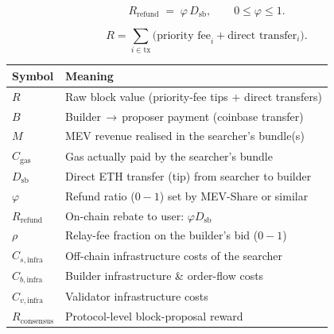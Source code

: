 \documentclass[a4paper,11pt]{article}
\begin{document}
\[
   R_{\text{refund}}
      \;=\; \varphi\,D_{\text{sb}},\qquad
   0\le \varphi \le 1.
\]

\[
  R = \sum_{i\in\text{tx}}
        \bigl(
          \text{priority fee}_i
          + \text{direct transfer}_i
        \bigr).
\]

\begin{center}
\begin{tabular}{@{}ll@{}}
\toprule
Symbol & Meaning \\ \midrule
$R$ & Raw block value (priority-fee tips $+$ direct transfers) \\
$B$ & Builder\,$\to$\,proposer payment (coinbase transfer) \\
$M$ & MEV revenue realised in the searcher’s bundle(s) \\
$C_{\text{gas}}$ & Gas actually paid by the searcher’s bundle \\
$D_{\text{sb}}$ & Direct ETH transfer (tip) from searcher to builder \\
$\varphi$ & Refund ratio ($0\!-\!1$) set by MEV-Share or similar \\
$R_{\text{refund}}$ & On-chain rebate to user: $\varphi D_{\text{sb}}$ \\
$\rho$ & Relay-fee fraction on the builder’s bid ($0\!-\!1$) \\
$C_{s,\text{infra}}$ & Off-chain infrastructure costs of the searcher \\
$C_{b,\text{infra}}$ & Builder infrastructure \& order-flow costs \\
$C_{v,\text{infra}}$ & Validator infrastructure costs \\
$R_{\text{consensus}}$ & Protocol-level block-proposal reward \\ \bottomrule
\end{tabular}
\end{center}
\end{document}

